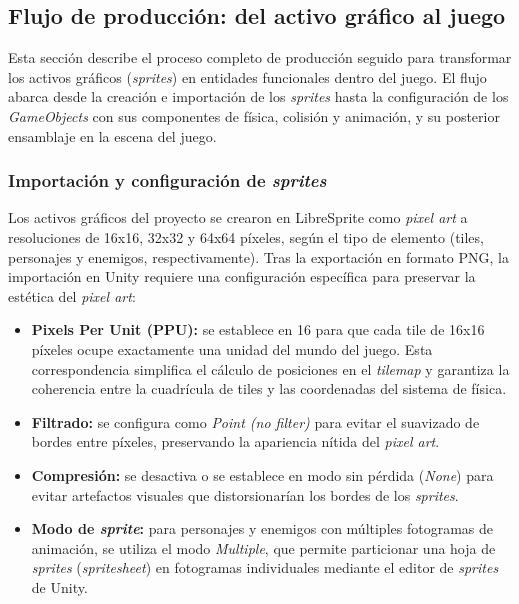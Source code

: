 \subsection{Flujo de producción: del activo gráfico al juego}


Esta sección describe el proceso completo de producción seguido para transformar los activos gráficos (\textit{sprites}) en entidades funcionales dentro del juego. El flujo abarca desde la creación e importación de los \textit{sprites} hasta la configuración de los \textit{GameObjects} con sus componentes de física, colisión y animación, y su posterior ensamblaje en la escena del juego.

\subsubsection{Importación y configuración de \textit{sprites}}


Los activos gráficos del proyecto se crearon en LibreSprite como \textit{pixel art} a resoluciones de 16x16, 32x32 y 64x64 píxeles, según el tipo de elemento (tiles, personajes y enemigos, respectivamente). Tras la exportación en formato PNG, la importación en Unity requiere una configuración específica para preservar la estética del \textit{pixel art}:

\begin{itemize}
\item \textbf{Pixels Per Unit (PPU):} se establece en 16 para que cada tile de 16x16 píxeles ocupe exactamente una unidad del mundo del juego. Esta correspondencia simplifica el cálculo de posiciones en el \textit{tilemap} y garantiza la coherencia entre la cuadrícula de tiles y las coordenadas del sistema de física.
\item \textbf{Filtrado:} se configura como \textit{Point (no filter)} para evitar el suavizado de bordes entre píxeles, preservando la apariencia nítida del \textit{pixel art}.
\item \textbf{Compresión:} se desactiva o se establece en modo sin pérdida (\textit{None}) para evitar artefactos visuales que distorsionarían los bordes de los \textit{sprites}.
\item \textbf{Modo de \textit{sprite}:} para personajes y enemigos con múltiples fotogramas de animación, se utiliza el modo \textit{Multiple}, que permite particionar una hoja de \textit{sprites} (\textit{spritesheet}) en fotogramas individuales mediante el editor de \textit{sprites} de Unity.
\end{itemize}

